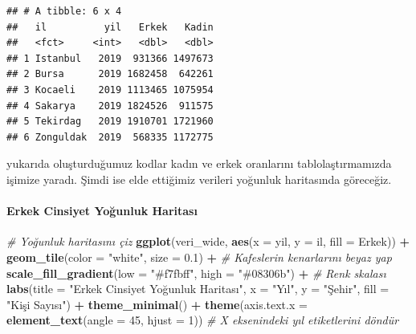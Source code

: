 \documentclass[
]{article}
\newenvironment{Shaded}{\begin{snugshade}}{\end{snugshade}}
\newcommand{\AttributeTok}[1]{\textcolor[rgb]{0.13,0.29,0.53}{#1}}
\newcommand{\CommentTok}[1]{\textcolor[rgb]{0.56,0.35,0.01}{\textit{#1}}}
\newcommand{\DecValTok}[1]{\textcolor[rgb]{0.00,0.00,0.81}{#1}}
\newcommand{\FloatTok}[1]{\textcolor[rgb]{0.00,0.00,0.81}{#1}}
\newcommand{\FunctionTok}[1]{\textcolor[rgb]{0.13,0.29,0.53}{\textbf{#1}}}
\newcommand{\NormalTok}[1]{#1}
\newcommand{\SpecialCharTok}[1]{\textcolor[rgb]{0.81,0.36,0.00}{\textbf{#1}}}
\newcommand{\StringTok}[1]{\textcolor[rgb]{0.31,0.60,0.02}{#1}}
\begin{document}
\begin{verbatim}
## # A tibble: 6 x 4
##   il          yil   Erkek   Kadin
##   <fct>     <int>   <dbl>   <dbl>
## 1 Istanbul   2019  931366 1497673
## 2 Bursa      2019 1682458  642261
## 3 Kocaeli    2019 1113465 1075954
## 4 Sakarya    2019 1824526  911575
## 5 Tekirdag   2019 1910701 1721960
## 6 Zonguldak  2019  568335 1172775
\end{verbatim}

yukarıda oluşturduğumuz kodlar kadın ve erkek oranlarını
tablolaştırmamızda işimize yaradı. Şimdi ise elde ettiğimiz verileri
yoğunluk haritasında göreceğiz.

\paragraph{Erkek Cinsiyet Yoğunluk
Haritası}\label{erkek-cinsiyet-youx11funluk-haritasux131}

\begin{Shaded}
\begin{Highlighting}[]
\CommentTok{\# Yoğunluk haritasını çiz}
\FunctionTok{ggplot}\NormalTok{(veri\_wide, }\FunctionTok{aes}\NormalTok{(}\AttributeTok{x =}\NormalTok{ yil, }\AttributeTok{y =}\NormalTok{ il, }\AttributeTok{fill =}\NormalTok{ Erkek)) }\SpecialCharTok{+}
  \FunctionTok{geom\_tile}\NormalTok{(}\AttributeTok{color =} \StringTok{"white"}\NormalTok{, }\AttributeTok{size =} \FloatTok{0.1}\NormalTok{) }\SpecialCharTok{+} \CommentTok{\# Kafeslerin kenarlarını beyaz yap}
  \FunctionTok{scale\_fill\_gradient}\NormalTok{(}\AttributeTok{low =} \StringTok{"\#f7fbff"}\NormalTok{, }\AttributeTok{high =} \StringTok{"\#08306b"}\NormalTok{) }\SpecialCharTok{+} \CommentTok{\# Renk skalası}
  \FunctionTok{labs}\NormalTok{(}\AttributeTok{title =} \StringTok{"Erkek Cinsiyet Yoğunluk Haritası"}\NormalTok{,}
       \AttributeTok{x =} \StringTok{"Yıl"}\NormalTok{,}
       \AttributeTok{y =} \StringTok{"Şehir"}\NormalTok{,}
       \AttributeTok{fill =} \StringTok{"Kişi Sayısı"}\NormalTok{) }\SpecialCharTok{+}
  \FunctionTok{theme\_minimal}\NormalTok{() }\SpecialCharTok{+}
  \FunctionTok{theme}\NormalTok{(}\AttributeTok{axis.text.x =} \FunctionTok{element\_text}\NormalTok{(}\AttributeTok{angle =} \DecValTok{45}\NormalTok{, }\AttributeTok{hjust =} \DecValTok{1}\NormalTok{)) }\CommentTok{\# X eksenindeki yıl etiketlerini döndür}
\end{Highlighting}
\end{Shaded}
\end{document}
